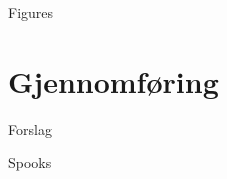 \documentclass[10pt]{beamer}
\begin{document}
        \begin{frame}{Figures}
		
   	  
	\end{frame}
	
	\section{Gjennomføring}
	
	\begin{frame}{Forslag}
		
	\end{frame}
	
	\begin{frame}[standout]
		Spooks
	\end{frame}
	
\end{document}
